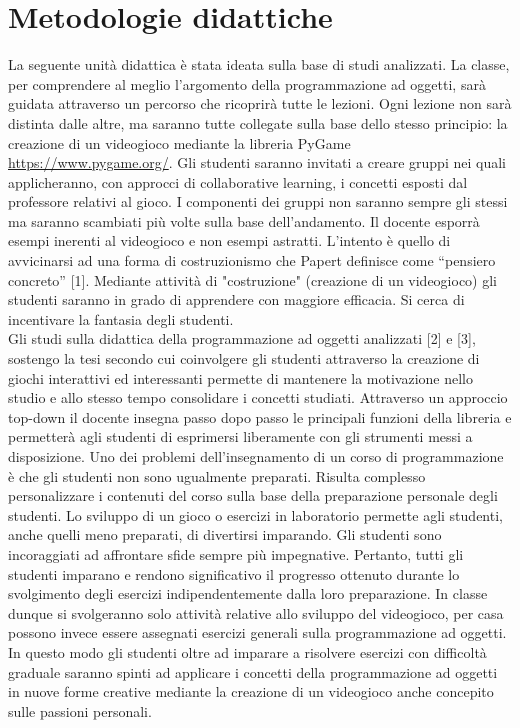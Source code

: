 \documentclass[12pt,a4paper]{article}
\begin{document}
\section{Metodologie didattiche}\label{metodologie-didattiche}


La seguente unità didattica è stata ideata sulla base di studi analizzati. La classe, per comprendere al meglio l’argomento della programmazione ad oggetti, sarà guidata attraverso un percorso che ricoprirà tutte le lezioni. Ogni lezione non sarà distinta dalle altre, ma saranno tutte collegate sulla base dello stesso principio: la creazione di un videogioco mediante la libreria PyGame \url{https://www.pygame.org/}. Gli studenti saranno invitati a creare gruppi nei quali applicheranno, con approcci di collaborative learning, i concetti esposti dal professore relativi al gioco. I componenti dei gruppi non saranno sempre gli stessi ma saranno scambiati più volte sulla base dell’andamento. Il docente esporrà esempi inerenti al videogioco e non esempi astratti. L’intento è quello di avvicinarsi ad una forma di costruzionismo che Papert definisce come “pensiero concreto” [1]. Mediante attività di "costruzione" (creazione di un videogioco) gli studenti saranno in grado di apprendere con maggiore efficacia. Si cerca di incentivare la fantasia degli studenti. \\
 Gli studi sulla didattica della programmazione ad oggetti analizzati [2] e [3], sostengo la tesi secondo cui coinvolgere gli studenti attraverso la creazione di giochi interattivi ed interessanti permette di mantenere la motivazione nello studio e allo stesso tempo consolidare i concetti studiati. Attraverso un approccio top-down il docente insegna passo dopo passo le principali funzioni della libreria e permetterà agli studenti di esprimersi liberamente con gli strumenti messi a disposizione. Uno dei problemi dell'insegnamento di un corso di programmazione è che gli studenti non sono ugualmente preparati. Risulta complesso personalizzare i contenuti del corso sulla base della preparazione personale degli studenti. Lo sviluppo di un gioco o esercizi in laboratorio permette agli studenti, anche quelli meno preparati, di divertirsi imparando. Gli studenti sono incoraggiati ad affrontare sfide sempre più impegnative. Pertanto, tutti gli studenti imparano e rendono significativo il progresso ottenuto durante lo svolgimento degli esercizi indipendentemente dalla loro preparazione. In classe dunque si svolgeranno solo attività relative allo sviluppo del videogioco, per casa possono invece essere assegnati esercizi generali sulla programmazione ad oggetti. In questo modo gli studenti oltre ad imparare a risolvere esercizi con difficoltà graduale saranno spinti ad applicare i concetti della programmazione ad oggetti in nuove forme creative mediante la creazione di un videogioco anche concepito sulle passioni personali.
\end{document}
